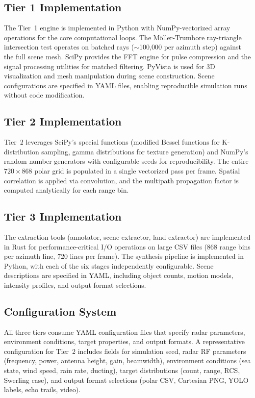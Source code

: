 \documentclass[conf]{new-aiaa}
\begin{document}
\subsection{Tier 1 Implementation}
The Tier~1 engine is implemented in Python with NumPy-vectorized array operations for the core computational loops. The M\"{o}ller-Trumbore ray-triangle intersection test operates on batched rays ($\sim$100{,}000 per azimuth step) against the full scene mesh. SciPy provides the FFT engine for pulse compression and the signal processing utilities for matched filtering. PyVista is used for 3D visualization and mesh manipulation during scene construction. Scene configurations are specified in YAML files, enabling reproducible simulation runs without code modification.

\subsection{Tier 2 Implementation}
Tier~2 leverages SciPy's special functions (modified Bessel functions for K-distribution sampling, gamma distributions for texture generation) and NumPy's random number generators with configurable seeds for reproducibility. The entire $720 \times 868$ polar grid is populated in a single vectorized pass per frame. Spatial correlation is applied via convolution, and the multipath propagation factor is computed analytically for each range bin.

\subsection{Tier 3 Implementation}
The extraction tools (annotator, scene extractor, land extractor) are implemented in Rust for performance-critical I/O operations on large CSV files (868 range bins per azimuth line, 720 lines per frame). The synthesis pipeline is implemented in Python, with each of the six stages independently configurable. Scene descriptions are specified in YAML, including object counts, motion models, intensity profiles, and output format selections.

\subsection{Configuration System}
All three tiers consume YAML configuration files that specify radar parameters, environment conditions, target properties, and output formats. A representative configuration for Tier~2 includes fields for simulation seed, radar RF parameters (frequency, power, antenna height, gain, beamwidth), environment conditions (sea state, wind speed, rain rate, ducting), target distributions (count, range, RCS, Swerling case), and output format selections (polar CSV, Cartesian PNG, YOLO labels, echo trails, video).
\end{document}
